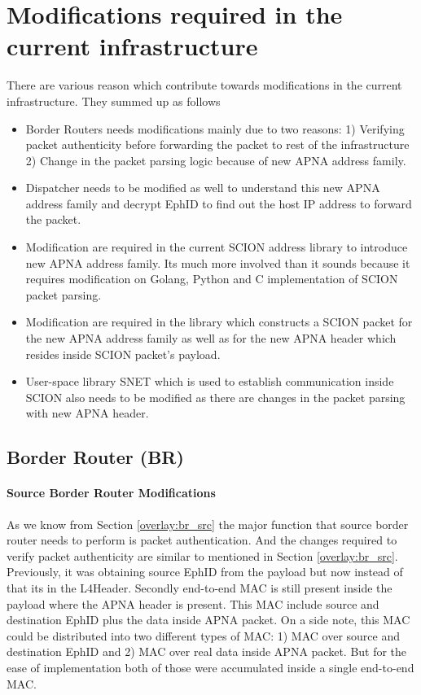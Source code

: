 \section{Modifications required in the current infrastructure} \label{addr:tech}
There are various reason which contribute towards modifications in the current infrastructure. They summed up as follows

\begin{itemize}
    \item Border Routers needs modifications mainly due to two reasons: 1) Verifying packet authenticity before forwarding the packet to rest of the infrastructure 2) Change in the packet parsing logic because of new APNA address family.
    \item Dispatcher needs to be modified as well to understand this new APNA address family and decrypt EphID to find out the host IP address to forward the packet.
    \item Modification are required in the current SCION address library to introduce new APNA address family. Its much more involved than it sounds because it requires modification on Golang, Python and C implementation of SCION packet parsing.
    \item Modification are required in the library which constructs a SCION packet for the new APNA address family as well as for the new APNA header which resides inside SCION packet's payload.
    \item User-space library SNET which is used to establish communication inside SCION also needs to be modified as there are changes in the packet parsing with new APNA header.
\end{itemize}
\subsection{Border Router (BR)}
\paragraph{Source Border Router Modifications}
As we know from Section \ref{overlay:br_src} the major function that source border router needs to perform is packet authentication. And the changes required to verify packet authenticity are similar to mentioned in Section \ref{overlay:br_src}. Previously, it was obtaining source EphID from the payload but now instead of that its in the L4Header. Secondly end-to-end MAC is still present inside the payload where the APNA header is present. This MAC include source and destination EphID plus the data inside APNA packet. On a side note, this MAC could be distributed into two different types of MAC: 1) MAC over source and destination EphID and 2) MAC over real data inside APNA packet. But for the ease of implementation both of those were accumulated inside a single end-to-end MAC.

